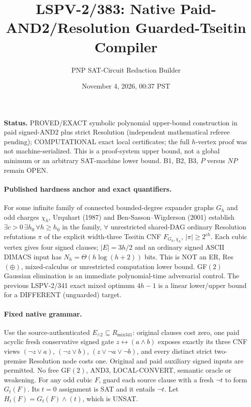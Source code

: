 \documentclass[11pt]{article}
\title{LSPV-2/383: Native Paid-AND2/Resolution Guarded-Tseitin Compiler}
\author{PNP SAT-Circuit Reduction Builder}
\date{November 4, 2026, 00:37 PST}
\begin{document}
\maketitle
\noindent\textbf{Status.} PROVED/EXACT symbolic polynomial upper-bound construction in paid signed-AND2 plus strict Resolution (independent mathematical referee pending); COMPUTATIONAL exact local certificates; the full $h$-vertex proof was not machine-serialized. This is a proof-system upper bound, not a global minimum or an arbitrary SAT-machine lower bound. B1, B2, B3, $P$ versus $NP$ remain OPEN.

\paragraph{Published hardness anchor and exact quantifiers.}
For some infinite family of connected bounded-degree expander graphs $G_h$ and odd charges $\chi_h$, Urquhart (1987) and Ben-Sasson--Wigderson (2001) establish $\exists c>0\,\exists h_0\,\forall h\ge h_0$ in the family, $\forall$ unrestricted shared-DAG ordinary Resolution refutations $\pi$ of the explicit width-three Tseitin CNF $F_{G_h,\chi_h}$, $|\pi|\ge2^{ch}$. Each cubic vertex gives four signed clauses; $|E|=3h/2$ and an ordinary signed ASCII DIMACS input has $N_h=\Theta(h\log(h+2))$ bits. This is NOT an ER, Res$(\oplus)$, mixed-calculus or unrestricted computation lower bound. GF$(2)$ Gaussian elimination is an immediate polynomial-time adversarial control. The previous LSPV-2/341 exact mixed optimum $4h-1$ is a linear lower/upper bound for a DIFFERENT (unguarded) target.

\paragraph{Fixed native grammar.}
Use the source-authenticated $E_{\land2}\subseteq R_{\mathrm{mix341}}$: original clauses cost zero, one paid acyclic fresh conservative signed gate $z\leftrightarrow(a\land b)$ exposes exactly its three CNF views $(\neg z\vee a)$, $(\neg z\vee b)$, $(z\vee\neg a\vee\neg b)$, and every distinct strict two-premise Resolution node costs one. Original and paid auxiliary signed inputs are permitted. No free GF$(2)$, AND3, LOCAL-CONVERT, semantic oracle or weakening. For any odd cubic $F$, guard each source clause with a fresh $\neg t$ to form $G_t(F)$. Its $t=0$ assignment is SAT and it entails $\neg t$. Let $H_t(F)=G_t(F)\wedge(t)$, which is UNSAT.
\end{document}

